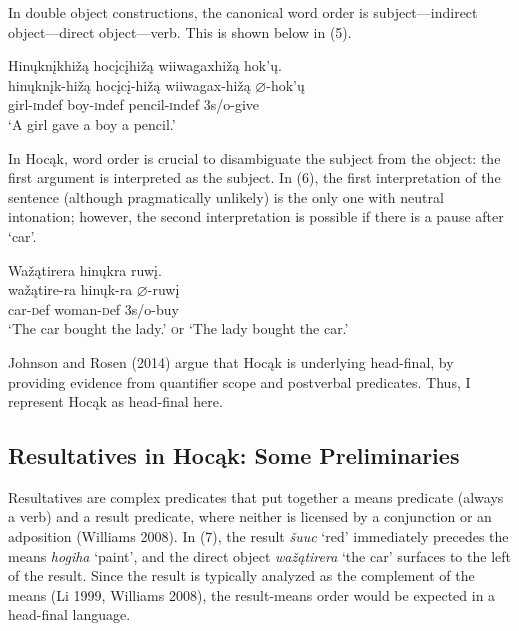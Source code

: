 \documentclass[output=paper]{LSP/langsci}
\begin{document}
In double object constructions, the canonical word order is subject---indirect object---direct object---verb. This is shown below in (5).

\begin{exe}

\ex \glll Hin\k{u}kn\k{i}khi\v{z}\k{a} hoc\k{i}c\k{i}hi\v{z}\k{a} wiiwagaxhi\v{z}\k{a} hok'\k{u}.\\
hin\k{u}kn\k{i}k-hi\v{z}\k{a} hoc\k{i}c\k{i}-hi\v{z}\k{a} wiiwagax-hi\v{z}\k{a} $\varnothing$-hok'\k{u}\\
girl-{\textsc indef} boy-{\textsc indef} pencil-{\textsc indef} {\textsc 3s/o}-give\\
\glt `A girl gave a boy a pencil.'

\end{exe}

In Hoc\k{a}k, word order is crucial to disambiguate the subject from the object: the first argument is interpreted as the subject. In (6), the first interpretation of the sentence (although pragmatically unlikely) is the only one with neutral intonation; however, the second interpretation is  possible if there is a pause after `car'.

\begin{exe}

\ex \glll Wa\v{z}\k{a}tirera hin\k{u}kra ruw\k{i}.\\
wa\v{z}\k{a}tire-ra hin\k{u}k-ra $\varnothing$-ruw\k{i}\\
car-{\textsc def} woman-{\textsc def} {\textsc 3s/o}-buy\\
\glt `The car bought the lady.' {\textsc or} `The lady bought the car.'

\end{exe}

Johnson and Rosen (2014) argue that Hoc\k{a}k is underlying head-final, by providing evidence from quantifier scope and postverbal predicates. Thus, I represent Hoc\k{a}k as head-final here.

\subsection{Resultatives in Hoc\k{a}k: Some Preliminaries}

Resultatives are complex predicates that put together a means predicate (always a verb) and a result predicate, where neither is licensed by a conjunction or an adposition (Williams 2008). In (7), the result \textit{\v{s}uuc} `red' immediately precedes the means \textit{hogiha} `paint', and the direct object \textit{wa\v{z}\k{a}tirera} `the car' surfaces to the left of the result. Since the result is typically analyzed as the complement of the means (Li 1999, Williams 2008), the result-means order would be expected in a head-final language.
\end{document}
